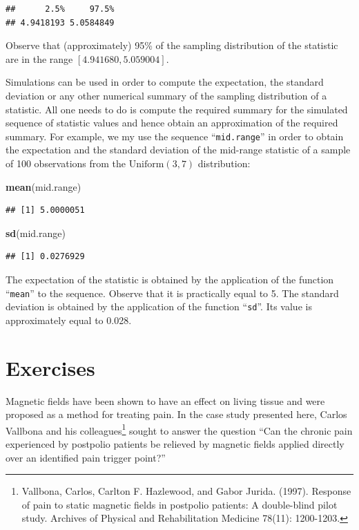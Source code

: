 \documentclass[]{krantz}
\makeatletter
\newenvironment{Shaded}{\begin{snugshade}}{\end{snugshade}}
\newcommand{\KeywordTok}[1]{\textcolor[rgb]{0.13,0.29,0.53}{\textbf{#1}}}
\newcommand{\NormalTok}[1]{#1}
\newenvironment{kframe}{%
\medskip{}
\setlength{\fboxsep}{.8em}
 \def\at@end@of@kframe{}%
 \ifinner\ifhmode%
  \def\at@end@of@kframe{\end{minipage}}%
  \begin{minipage}{\columnwidth}%
 \fi\fi%
 \def\FrameCommand##1{\hskip\@totalleftmargin \hskip-\fboxsep
 \colorbox{shadecolor}{##1}\hskip-\fboxsep
     \hskip-\linewidth \hskip-\@totalleftmargin \hskip\columnwidth}%
 \MakeFramed {\advance\hsize-\width
   \@totalleftmargin\z@ \linewidth\hsize
   \@setminipage}}%
 {\par\unskip\endMakeFramed%
 \at@end@of@kframe}
\renewenvironment{Shaded}{\begin{kframe}}{\end{kframe}}
\theoremstyle{definition}
\theoremstyle{definition}
\theoremstyle{definition}
\theoremstyle{remark}
\makeatother
\begin{document}
\begin{verbatim}
##      2.5%     97.5% 
## 4.9418193 5.0584849
\end{verbatim}

Observe that (approximately) 95\% of the sampling distribution of the
statistic are in the range \([4.941680, 5.059004]\).

Simulations can be used in order to compute the expectation, the
standard deviation or any other numerical summary of the sampling
distribution of a statistic. All one needs to do is compute the required
summary for the simulated sequence of statistic values and hence obtain
an approximation of the required summary. For example, we my use the
sequence ``\texttt{mid.range}'' in order to obtain the expectation and the
standard deviation of the mid-range statistic of a sample of 100
observations from the \(\mathrm{Uniform}(3,7)\) distribution:

\begin{Shaded}
\begin{Highlighting}[]
\KeywordTok{mean}\NormalTok{(mid.range)}
\end{Highlighting}
\end{Shaded}

\begin{verbatim}
## [1] 5.0000051
\end{verbatim}

\begin{Shaded}
\begin{Highlighting}[]
\KeywordTok{sd}\NormalTok{(mid.range)}
\end{Highlighting}
\end{Shaded}

\begin{verbatim}
## [1] 0.0276929
\end{verbatim}

The expectation of the statistic is obtained by the application of the
function ``\texttt{mean}'' to the sequence. Observe that it is practically equal
to 5. The standard deviation is obtained by the application of the
function ``\texttt{sd}''. Its value is approximately equal to 0.028.

\hypertarget{exercises-4}{%
\section{Exercises}\label{exercises-4}}

Magnetic fields have been shown to have an effect on living tissue and
were proposed as a method for treating pain. In the case study presented
here, Carlos Vallbona and his colleagues\footnote{Vallbona, Carlos, Carlton F. Hazlewood, and Gabor Jurida. (1997).
  Response of pain to static magnetic fields in postpolio patients: A
  double-blind pilot study. Archives of Physical and Rehabilitation
  Medicine 78(11): 1200-1203.} sought to answer the
question ``Can the chronic pain experienced by postpolio patients be
relieved by magnetic fields applied directly over an identified pain
trigger point?''
\end{document}

